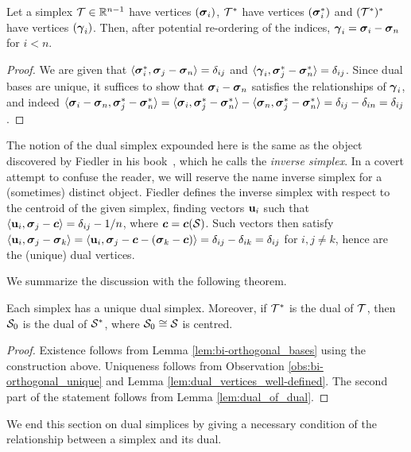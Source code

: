 \begin{lemma}
	\label{lem:dual_of_dual}
	Let a simplex $\mathcal{T}\in\mathbb{R}^{n-1}$ have vertices $(\vb*{\sigma}_i)$, $\mathcal{T}^*$ have vertices $(\vb*{\sigma}_i^*)$ and $(\mathcal{T}^*)^*$ have vertices $(\vb*{\gamma}_i)$. Then, after potential re-ordering of the indices, $\vb*{\gamma}_i = \vb*{\sigma}_i-\vb*{\sigma}_n$ for $i<n$. 
\end{lemma}
\begin{proof}
	We are given that $\langle \vb*{\sigma}_i^*,\vb*{\sigma}_j-\vb*{\sigma}_n\rangle=\delta_{ij}$ and $\langle \vb*{\gamma}_i,\vb*{\sigma}_j^*-\vb*{\sigma}_n^*\rangle=\delta_{ij}$. Since dual bases are unique, it suffices to show that $\vb*{\sigma}_i-\vb*{\sigma}_n$ satisfies the relationships of $\vb*{\gamma}_i$, and indeed $\langle \vb*{\sigma}_i-\vb*{\sigma}_n,\vb*{\sigma}_j^*-\vb*{\sigma}_n^*\rangle = \langle \vb*{\sigma}_i,\vb*{\sigma}_j^*-\vb*{\sigma}_n^*\rangle - \langle \vb*{\sigma}_n,\vb*{\sigma}_j^*-\vb*{\sigma}_n^*\rangle = \delta_{ij} - \delta_{in} = \delta_{ij}$. 
\end{proof} 

\begin{remark}
	The notion of the dual simplex expounded here is the same as the object discovered by Fiedler in his book~\cite[Chapter 5]{fiedler2011matrices}, which he calls the \emph{inverse simplex}. In a covert attempt to confuse the reader, we will reserve the name inverse simplex for a (sometimes) distinct object. Fiedler defines the inverse simplex with respect to the centroid of the given simplex, finding vectors $\vb{u}_i$ such that $\langle \vb{u}_i,\vb*{\sigma}_j-\vb*{c}\rangle = \delta_{ij}-1/n$, where $\vb*{c}=\vb*{c}(\mathcal{S})$.  Such vectors then satisfy $\langle \vb{u}_i,\vb*{\sigma}_j-\vb*{\sigma}_k\rangle = \langle \vb{u}_i,\vb*{\sigma}_j-\vb*{c}-(\vb*{\sigma}_k-\vb*{c})\rangle = \delta_{ij}-\delta_{ik}=\delta_{ij}$ for $i,j\neq k$, hence are the (unique) dual vertices. 
\end{remark}

We summarize the discussion with the following theorem. 

\begin{theorem}
	\label{thm:dual_simplex}
Each simplex has a unique dual simplex. Moreover, if $\mathcal{T}^*$ is the dual of $\mathcal{T}$, then $\mathcal{S}_0$ is the dual of $\mathcal{S}^*$, where $\mathcal{S}_0\cong \mathcal{S}$ is centred. 
  \end{theorem}
\begin{proof}
Existence follows from Lemma \ref{lem:bi-orthogonal_bases} using the construction above. Uniqueness follows from Observation \ref{obs:bi-orthogonal_unique} and Lemma \ref{lem:dual_vertices_well-defined}. The second part of the statement follows from Lemma \ref{lem:dual_of_dual}. 
\end{proof}

We end  this section  on dual simplices by giving a necessary condition of the relationship between a simplex and its dual. 

